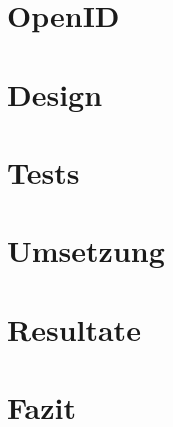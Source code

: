 \documentclass[
11pt, %
a4paper, %
BCOR10mm, %
DIV14, %
footsepline = false, %
headsepline, %
oneside, %
openright,
halfparskip, %
abstracton, %
listof=totocnumbered, %
bibliography=totocnumbered %
]{scrreprt}
\begin{document}
  \chapter{OpenID}
  \label{cha:OpenID}
  

  \chapter{Design}
  \label{cha:Design}
  
  
  \chapter{Tests}
  \label{cha:Tests}
  
  
  \chapter{Umsetzung}
  \label{cha:Umsetzung}
  

  \chapter{Resultate}
  \label{cha:Resultate}
  

  \chapter{Fazit}
  \label{cha:Fazit}
  
  
  \appendix  
  \listoffigures
  \listoftables
  \lstlistoflistings
  
  \glsaddall
  \printglossaries
  
  \nocite{*}
  
  
\end{document}
